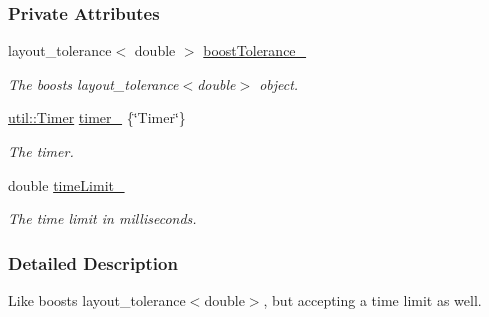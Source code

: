 \subsubsection*{Private Attributes}
\begin{DoxyCompactItemize}
\item 
layout\+\_\+tolerance$<$ double $>$ \hyperlink{structslb_1_1core_1_1ui_1_1LayoutTolerance_ac0a9a65b131dc2c8b0e624781b56e452}{boost\+Tolerance\+\_\+}\hypertarget{structslb_1_1core_1_1ui_1_1LayoutTolerance_ac0a9a65b131dc2c8b0e624781b56e452}{}\label{structslb_1_1core_1_1ui_1_1LayoutTolerance_ac0a9a65b131dc2c8b0e624781b56e452}

\begin{DoxyCompactList}\small\item\em The boost\textquotesingle{}s {\ttfamily layout\+\_\+tolerance$<$double$>$} object. \end{DoxyCompactList}\item 
\hyperlink{structslb_1_1core_1_1util_1_1Timer}{util\+::\+Timer} \hyperlink{structslb_1_1core_1_1ui_1_1LayoutTolerance_ade0d246c0b06a4036de7355e65a0a67c}{timer\+\_\+} \{\char`\"{}Timer\char`\"{}\}\hypertarget{structslb_1_1core_1_1ui_1_1LayoutTolerance_ade0d246c0b06a4036de7355e65a0a67c}{}\label{structslb_1_1core_1_1ui_1_1LayoutTolerance_ade0d246c0b06a4036de7355e65a0a67c}

\begin{DoxyCompactList}\small\item\em The timer. \end{DoxyCompactList}\item 
double \hyperlink{structslb_1_1core_1_1ui_1_1LayoutTolerance_a8f3497521ba38cb0663755c5d3a34f03}{time\+Limit\+\_\+}\hypertarget{structslb_1_1core_1_1ui_1_1LayoutTolerance_a8f3497521ba38cb0663755c5d3a34f03}{}\label{structslb_1_1core_1_1ui_1_1LayoutTolerance_a8f3497521ba38cb0663755c5d3a34f03}

\begin{DoxyCompactList}\small\item\em The time limit in milliseconds. \end{DoxyCompactList}\end{DoxyCompactItemize}


\subsubsection{Detailed Description}
Like boost\textquotesingle{}s {\ttfamily layout\+\_\+tolerance$<$double$>$}, but accepting a time limit as well. 

